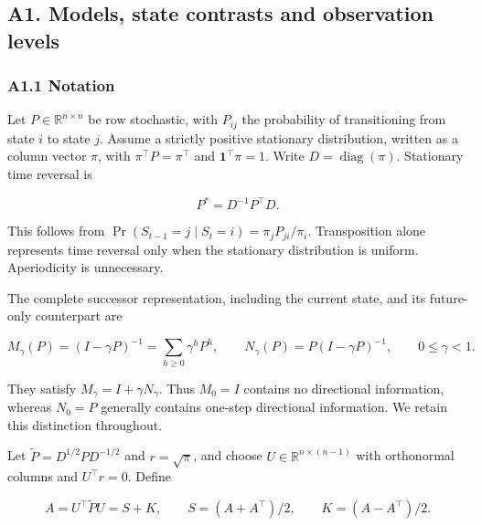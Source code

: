 \documentclass[11pt,a4paper]{article}
\begin{document}
\subsection{A1. Models, state contrasts and observation
levels}\label{a1.-models-state-contrasts-and-observation-levels}

\subsubsection{A1.1 Notation}\label{a1.1-notation}

\par
\noindent\begin{minipage}{\linewidth}

Let \(P\in\mathbb R^{n\times n}\) be row stochastic, with \(P_{ij}\) the
probability of transitioning from state \(i\) to state \(j\). Assume a
strictly positive stationary distribution, written as a column vector
\(\pi\), with \(\pi^\top P=\pi^\top\) and \(\mathbf1^\top\pi=1\). Write
\(D=\operatorname{diag}(\pi)\). Stationary time reversal is

\[
P^*=D^{-1}P^\top D.
\]

\end{minipage}\par

This follows from \(\Pr(S_{t-1}=j\mid S_t=i)=\pi_jP_{ji}/\pi_i\).
Transposition alone represents time reversal only when the stationary
distribution is uniform. Aperiodicity is unnecessary.

\par
\noindent\begin{minipage}{\linewidth}

The complete successor representation, including the current state, and
its future-only counterpart are

\[
M_\gamma(P)=(I-\gamma P)^{-1}
=\sum_{h\ge0}\gamma^hP^h,\qquad
N_\gamma(P)=P(I-\gamma P)^{-1},\qquad0\le\gamma<1.
\]

\end{minipage}\par

They satisfy \(M_\gamma=I+\gamma N_\gamma\). Thus \(M_0=I\) contains no
directional information, whereas \(N_0=P\) generally contains one-step
directional information. We retain this distinction throughout.

\par
\noindent\begin{minipage}{\linewidth}

Let \(\widetilde P=D^{1/2}PD^{-1/2}\) and \(r=\sqrt\pi\), and choose
\(U\in\mathbb R^{n\times(n-1)}\) with orthonormal columns and
\(U^\top r=0\). Define

\[
A=U^\top\widetilde P U=S+K,\qquad
S=(A+A^\top)/2,\qquad K=(A-A^\top)/2.
\]

\end{minipage}\par
\end{document}

